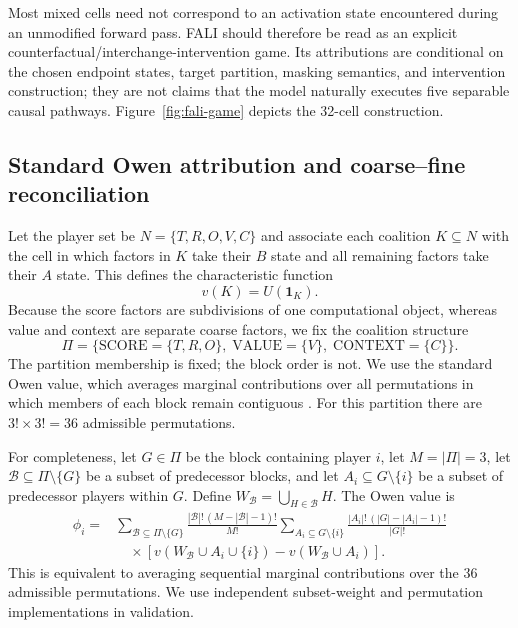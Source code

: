 \documentclass[pdflatex,sn-mathphys-ay]{sn-jnl}
\begin{document}
Most mixed cells need not correspond to an activation state encountered during an unmodified forward pass. FALI should therefore be read as an explicit counterfactual/interchange-intervention game. Its attributions are conditional on the chosen endpoint states, target partition, masking semantics, and intervention construction; they are not claims that the model naturally executes five separable causal pathways. Figure~\ref{fig:fali-game} depicts the 32-cell construction.



\subsection{Standard Owen attribution and coarse--fine reconciliation}\label{sec:owen}

Let the player set be $N=\{T,R,O,V,C\}$ and associate each coalition $K\subseteq N$ with the cell in which factors in $K$ take their $B$ state and all remaining factors take their $A$ state. This defines the characteristic function
\begin{equation}
v(K)=U(\mathbf{1}_{K}).
\label{eq:characteristic-game}
\end{equation}
Because the score factors are subdivisions of one computational object, whereas value and context are separate coarse factors, we fix the coalition structure
\begin{equation}
\Pi=\{\mathrm{SCORE}=\{T,R,O\},\;\mathrm{VALUE}=\{V\},\;\mathrm{CONTEXT}=\{C\}\}.
\label{eq:owen-partition}
\end{equation}
The partition membership is fixed; the block order is not. We use the standard Owen value, which averages marginal contributions over all permutations in which members of each block remain contiguous \citep{owen1977values}. For this partition there are $3!\times3!=36$ admissible permutations.

For completeness, let $G\in\Pi$ be the block containing player $i$, let $M=|\Pi|=3$, let $\mathcal{B}\subseteq\Pi\setminus\{G\}$ be a subset of predecessor blocks, and let $A_i\subseteq G\setminus\{i\}$ be a subset of predecessor players within $G$. Define $W_{\mathcal{B}}=\bigcup_{H\in\mathcal{B}}H$. The Owen value is
\begin{align}
\phi_i
={}&\sum_{\mathcal{B}\subseteq\Pi\setminus\{G\}}
\frac{|\mathcal{B}|!\,(M-|\mathcal{B}|-1)!}{M!}
\sum_{A_i\subseteq G\setminus\{i\}}
\frac{|A_i|!\,(|G|-|A_i|-1)!}{|G|!} \\
&\quad\times\left[
 v(W_{\mathcal{B}}\cup A_i\cup\{i\})
-v(W_{\mathcal{B}}\cup A_i)
\right].
\label{eq:owen-value}
\end{align}
This is equivalent to averaging sequential marginal contributions over the 36 admissible permutations. We use independent subset-weight and permutation implementations in validation.
\end{document}
